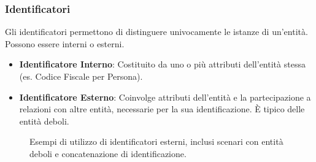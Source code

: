 \subsubsection{Identificatori}
Gli identificatori permettono di distinguere univocamente le istanze di un'entità. Possono essere interni o esterni.
\begin{itemize}
    \item \textbf{Identificatore Interno}: Costituito da uno o più attributi dell'entità stessa (es. Codice Fiscale per Persona).
    \item \textbf{Identificatore Esterno}: Coinvolge attributi dell'entità e la partecipazione a relazioni con altre entità, necessarie per la sua identificazione. È tipico delle entità deboli.
\end{itemize}
\begin{figure}[h!]
    \centering
    \quad
    \caption{Esempi di utilizzo di identificatori esterni, inclusi scenari con entità deboli e concatenazione di identificazione.}
    \label{fig:er_identificatori_esterni}
\end{figure}

